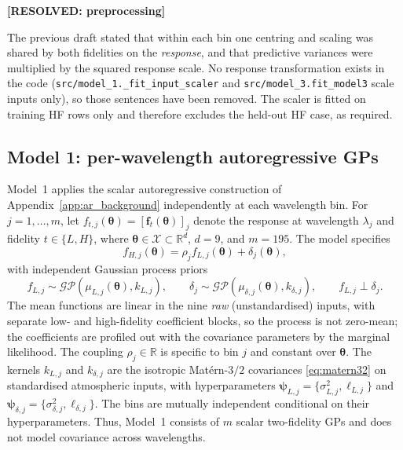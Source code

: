 \documentclass[12pt, letterpaper, oneside]{article}
\newcommand{\resolved}[2]{\par\begingroup\small\color{green!35!black}%
\noindent\textbf{[RESOLVED: #1]}\par\nobreak\noindent #2\par\endgroup}
\begin{document}
\resolved{preprocessing}{The previous draft stated that within each bin one
centring and scaling was shared by both fidelities on the \emph{response}, and
that predictive variances were multiplied by the squared response scale. No
response transformation exists in the code
(\texttt{src/model\_1.\_fit\_input\_scaler} and
\texttt{src/model\_3.fit\_model3} scale inputs only), so those sentences have
been removed. The scaler is fitted on training HF rows only and therefore
excludes the held-out HF case, as required.}

\subsection{Model 1: per-wavelength autoregressive GPs}
\label{subsec:model1}

Model~1 applies the scalar autoregressive construction of
Appendix~\ref{app:ar_background} independently at each wavelength bin. For
$j=1,\ldots,m$, let $f_{t,j}(\bm\theta)=[\mathbf{f}_t(\bm\theta)]_j$ denote
the response at wavelength $\lambda_j$ and fidelity $t\in\{L,H\}$, where
$\bm\theta\in\mathcal{X}\subset\mathbb{R}^{d}$, $d=9$, and $m=195$.
The model specifies
\begin{equation}
    f_{H,j}(\bm\theta)
    = \rho_j f_{L,j}(\bm\theta) + \delta_j(\bm\theta),
    \label{eq:model1_ar}
\end{equation}
with independent Gaussian process priors
\begin{equation}
    f_{L,j}\sim\mathcal{GP}(\mu_{L,j}(\bm\theta),k_{L,j}),
    \qquad
    \delta_j\sim\mathcal{GP}(\mu_{\delta,j}(\bm\theta),k_{\delta,j}),
    \qquad
    f_{L,j}\perp\delta_j.
    \label{eq:model1_gps}
\end{equation}
The mean functions are linear in the nine \emph{raw} (unstandardised) inputs,
with separate low- and high-fidelity coefficient blocks, so the process is not
zero-mean; the coefficients are profiled out with the covariance parameters by
the marginal likelihood. The coupling $\rho_j\in\mathbb{R}$ is specific to bin
$j$ and constant over $\bm\theta$. The kernels $k_{L,j}$ and $k_{\delta,j}$
are the isotropic Matérn-$3/2$ covariances \eqref{eq:matern32} on standardised
atmospheric inputs, with hyperparameters
$\bm\psi_{L,j}=\{\sigma^2_{L,j},\ell_{L,j}\}$ and
$\bm\psi_{\delta,j}=\{\sigma^2_{\delta,j},\ell_{\delta,j}\}$.
The bins are mutually independent conditional on their hyperparameters.
Thus, Model~1 consists of $m$ scalar two-fidelity GPs and does not model
covariance across wavelengths.
\end{document}
